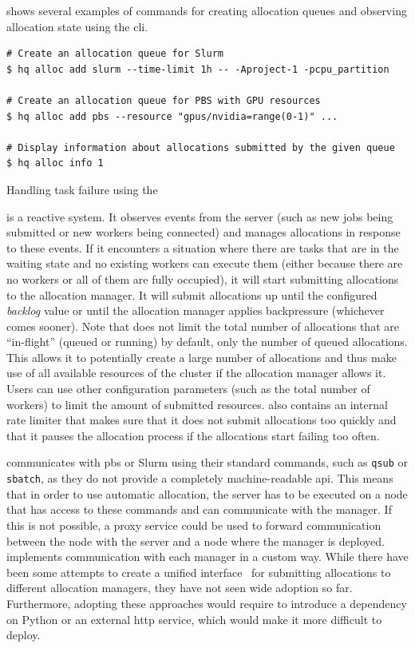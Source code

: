  shows several examples of commands for creating allocation queues and
observing allocation state using the \hyperqueue{} \gls{cli}.

\begin{listing}[h]
	\begin{verbatim}
# Create an allocation queue for Slurm
$ hq alloc add slurm --time-limit 1h -- -Aproject-1 -pcpu_partition

# Create an allocation queue for PBS with GPU resources
$ hq alloc add pbs --resource "gpus/nvidia=range(0-1)" ...

# Display information about allocations submitted by the given queue
$ hq alloc info 1
	\end{verbatim}
	\caption{Handling task failure using the \hyperqueue{} }
	\label{lst:hq-cli-autoalloc}
\end{listing}

\Autoalloc{} is a reactive system. It observes events from the server (such as new jobs
being submitted or new workers being connected) and manages allocations in response to these
events. If it encounters a situation where there are tasks that are in the waiting state and no
existing workers can execute them (either because there are no workers or all of them are fully
occupied), it will start submitting allocations to the allocation manager. It will submit
allocations up until the configured \emph{backlog} value or until the allocation manager
applies backpressure (whichever comes sooner). Note that \autoalloc{} does not limit the
total number of allocations that are ``in-flight'' (queued or running) by default, only the number
of queued allocations. This allows it to potentially create a large number of allocations and thus
make use of all available resources of the cluster if the allocation manager allows it. Users can
use other configuration parameters (such as the total number of workers) to limit the amount of
submitted resources. \Autoalloc{} also contains an internal rate limiter that makes sure
that it does not submit allocations too quickly and that it pauses the allocation process if the
allocations start failing too often.

\hyperqueue{} communicates with \gls{pbs} or Slurm using their standard
commands, such as \texttt{qsub} or \texttt{sbatch}, as they do not provide a
completely machine-readable \gls{api}. This means that in order to use automatic
allocation, the server has to be executed on a node that has access to these commands and can
communicate with the manager. If this is not possible, a proxy service could be used to forward
communication between the node with the server and a node where the manager is deployed.
\hyperqueue{} implements communication with each manager in a custom way. While there
have been some attempts to create a unified interface~\cite{psij,workflow-alloc-manager-comm} for submitting
allocations to different allocation managers, they have not seen wide adoption so far. Furthermore,
adopting these approaches would require \hq{} to introduce a dependency on Python
or an external \gls{http} service, which would make it more difficult to deploy.

